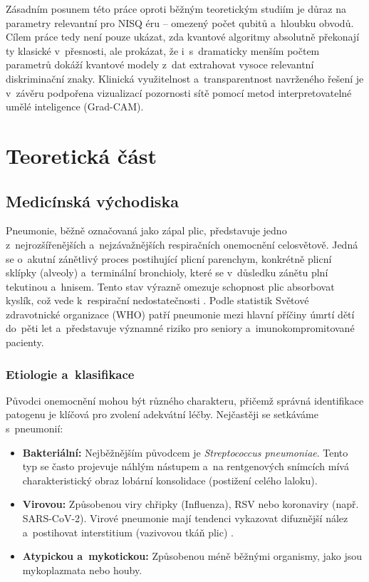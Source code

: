 \documentclass[12pt, a4paper]{report}
\begin{document}
Zásadním posunem této práce oproti běžným teoretickým studiím je důraz na parametry relevantní pro NISQ éru -- omezený počet qubitů a~hloubku obvodů. Cílem práce tedy není pouze ukázat, zda kvantové algoritmy absolutně překonají ty klasické v~přesnosti, ale prokázat, že i~s~dramaticky menším počtem parametrů dokáží kvantové modely z~dat extrahovat vysoce relevantní diskriminační znaky. Klinická využitelnost a~transparentnost navrženého řešení je v~závěru podpořena vizualizací pozornosti sítě pomocí metod interpretovatelné umělé inteligence (Grad-CAM).

\chapter{Teoretická část} \label{chap:teorie}

\section{Medicínská východiska} \label{sec:medicina}

Pneumonie, běžně označovaná jako zápal plic, představuje jedno z~nejrozšířenějších a~nejzávažnějších respiračních onemocnění celosvětově.
Jedná se o~akutní zánětlivý proces postihující plicní parenchym, konkrétně plicní sklípky (alveoly) a~terminální bronchioly, které se v~důsledku zánětu plní tekutinou a~hnisem.
Tento stav výrazně omezuje schopnost plic absorbovat kyslík, což vede k~respirační nedostatečnosti \cite{who_pneumonia}.
Podle statistik Světové zdravotnické organizace (WHO) patří pneumonie mezi hlavní příčiny úmrtí dětí do~pěti let a~představuje významné riziko pro seniory a~imunokompromitované pacienty.

\subsection{Etiologie a~klasifikace}
Původci onemocnění mohou být různého charakteru, přičemž správná identifikace patogenu je klíčová pro zvolení adekvátní léčby.
Nejčastěji se setkáváme s~pneumonií:
\begin{itemize}
    \item \textbf{Bakteriální:} Nejběžnějším původcem je \textit{Streptococcus pneumoniae}.
    Tento typ se často projevuje náhlým nástupem a~na rentgenových snímcích mívá charakteristický obraz lobární konsolidace (postižení celého laloku).
    \item \textbf{Virovou:} Způsobenou viry chřipky (Influenza), RSV nebo koronaviry (např. SARS-CoV-2).
    Virové pneumonie mají tendenci vykazovat difuznější nález a~postihovat interstitium (vazivovou tkáň plic) \cite{radiology_viral_vs_bacterial}.
    \item \textbf{Atypickou a~mykotickou:} Způsobenou méně běžnými organismy, jako jsou mykoplazmata nebo houby.
\end{itemize}
\end{document}
